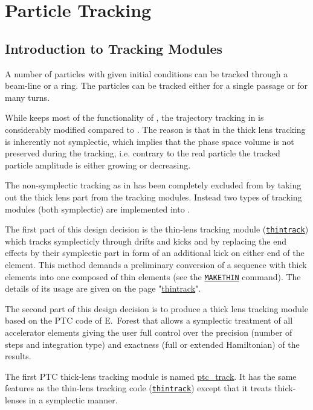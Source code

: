 \chapter{Particle Tracking}
\label{chap:tracking}\label{chap:thintrack}


\section{Introduction to \madx Tracking Modules}
\label{sec:trackintro}

A number of particles with given initial conditions can be tracked
through a beam-line or a ring. The particles can be tracked either for a
single passage or for many turns.  


While \madx keeps most of the functionality of \madeight, the
trajectory tracking in \madx is considerably modified compared to
\madeight. 
The reason is that in \madeight the thick lens tracking is inherently not
symplectic, which implies that the phase space volume is not preserved
during the tracking, i.e. contrary to the real particle the tracked
particle amplitude is either growing or decreasing. 


The non-symplectic tracking as in \madeight has been completely excluded
from \madx by taking out the thick lens part from the tracking
modules. Instead two types of tracking modules (both symplectic) are
implemented into \madx. 


The first part of this design decision is the thin-lens tracking module
(\texttt{\href{../thintrack/thintrack.html}{thintrack}})  which tracks
symplecticly through drifts and kicks and by replacing the end effects
by their symplectic part in form of an additional kick on either  end of
the element. This method demands a preliminary conversion of a sequence
with thick elements into one composed of thin elements (see the
\texttt{\href{../makethin/makethin.html}{MAKETHIN}} command). The
details of its usage are given on the page
"\href{../thintrack/thintrack.html}{thintrack}". 


The second part of this design decision is to produce a thick lens
tracking module based on the PTC code of E.~Forest that
allows a symplectic treatment of all accelerator elements giving the
user full control over the precision (number of steps and integration
type) and exactness (full or extended Hamiltonian) of the results. 


The first PTC thick-lens tracking module is named
\href{../ptc_track/ptc_track.html}{ptc\_track}. 
It has the same features as the thin-lens tracking code
(\texttt{\href{../thintrack/thintrack.html}{thintrack}}) except that it
treats thick-lenses in a symplectic manner. 


